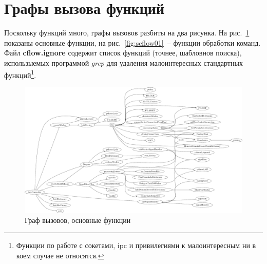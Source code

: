 \documentclass[a4paper,12pt]{report}
\begin{document}
% 

% 
% 
% 
% 
% 
% 
% 
% 
% 
% 


\section{Графы вызова функций}

Поскольку функций много, графы вызовов разбиты на два рисунка. На рис.~\ref{fig:ccflow01} показаны основные функции, на рис.~\ref{fig:scflow01}~-- функции обработки команд. Файл \textbf{cflow.ignore} содержит список функций (точнее, шабловнов поиска), использыемых программой \textit{grep} для удаления малоинтересных стандартных функций\footnote{Функции по работе с сокетами, ipc и привилегиями к малоинтересным ни в коем случае не относятся.}.

\begin{figure}
\centering
\includegraphics[width=\textwidth]{include/ccflow01_dot.pdf}
\caption{Граф вызовов, основные функции}
\label{fig:ccflow01}
\end{figure}
\end{document}
